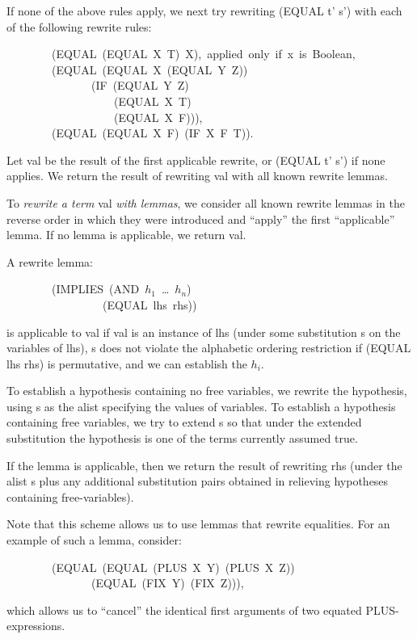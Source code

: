 \documentclass[11pt]{book}
\newenvironment{pubasis}{\begin{flushleft}\ttfamily\small}{\normalsize\rmfamily\end{flushleft}}
\newcommand{\pubinlineunderline}[1]{\emph{#1}}
\begin{document}
If none of the above rules apply, we next try rewriting
(EQUAL t' s') with each of the following rewrite rules:
\begin{pubasis}
~~~~~~~~(EQUAL~(EQUAL~X~T)~X),~applied~only~if~x~is~Boolean,\\

~~~~~~~~(EQUAL~(EQUAL~X~(EQUAL~Y~Z))\\
~~~~~~~~~~~~~~~(IF~(EQUAL~Y~Z)\\
~~~~~~~~~~~~~~~~~~~(EQUAL~X~T)\\
~~~~~~~~~~~~~~~~~~~(EQUAL~X~F))),\\

~~~~~~~~(EQUAL~(EQUAL~X~F)~(IF~X~F~T)).\\
\end{pubasis}
Let val be the result of the first
applicable rewrite, or (EQUAL t' s') if none applies.
We return the result of rewriting val with all known
rewrite lemmas.

To \pubinlineunderline{rewrite a term} val \pubinlineunderline{with lemmas}, we consider all
known rewrite lemmas in the reverse order in which
they were introduced and ``apply'' the first ``applicable''
lemma.  If no lemma is applicable, we return val.

A rewrite lemma:
\begin{pubasis}
~~~~~~~~(IMPLIES~(AND~$h_{1}$~\ldots{}~$h_{n}$)\\
~~~~~~~~~~~~~~~~~(EQUAL~lhs~rhs))\\
\end{pubasis}
is applicable to val if val is an instance of lhs (under
some substitution s on the variables of lhs), s does not violate the alphabetic
ordering restriction if (EQUAL lhs rhs) is permutative,
and we can establish the $h_{i}$.

To establish a hypothesis containing no free variables,
we rewrite the hypothesis, using s as the alist
specifying the values of variables.
To establish a hypothesis containing free variables,
we try to extend s so that under the extended substitution
the hypothesis is one of the terms currently assumed
true.

If the lemma is applicable, then we return the result of
rewriting rhs (under the alist s plus any additional
substitution pairs obtained in relieving hypotheses
containing free-variables).

Note that this scheme allows us to use lemmas that rewrite equalities.
For an example of such a lemma, consider:
\begin{pubasis}
~~~~~~~~(EQUAL~(EQUAL~(PLUS~X~Y)~(PLUS~X~Z))\\
~~~~~~~~~~~~~~~(EQUAL~(FIX~Y)~(FIX~Z))),\\
\end{pubasis}
which allows us to ``cancel'' the identical first arguments of two
equated PLUS-expressions.
\end{document}
